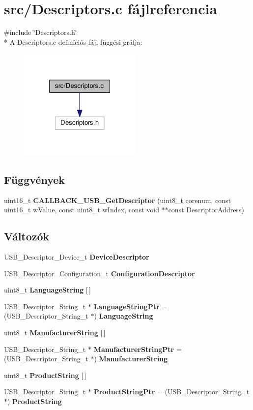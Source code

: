 \section{src/\-Descriptors.c fájlreferencia}
\label{_descriptors_8c}
{\ttfamily \#include \char`\"{}Descriptors.\-h\char`\"{}}\\*
A Descriptors.\-c definíciós fájl függési gráfja\-:
\nopagebreak
\begin{figure}[H]
\begin{center}
\leavevmode
\includegraphics[width=172pt]{_descriptors_8c__incl}
\end{center}
\end{figure}
\subsection*{Függvények}
\begin{DoxyCompactItemize}
\item 
uint16\-\_\-t {\bf C\-A\-L\-L\-B\-A\-C\-K\-\_\-\-U\-S\-B\-\_\-\-Get\-Descriptor} (uint8\-\_\-t corenum, const uint16\-\_\-t w\-Value, const uint8\-\_\-t w\-Index, const void $\ast$$\ast$const Descriptor\-Address)
\end{DoxyCompactItemize}
\subsection*{Változók}
\begin{DoxyCompactItemize}
\item 
U\-S\-B\-\_\-\-Descriptor\-\_\-\-Device\-\_\-t {\bf Device\-Descriptor}
\item 
U\-S\-B\-\_\-\-Descriptor\-\_\-\-Configuration\-\_\-t {\bf Configuration\-Descriptor}
\item 
uint8\-\_\-t {\bf Language\-String} [$\,$]
\item 
U\-S\-B\-\_\-\-Descriptor\-\_\-\-String\-\_\-t $\ast$ {\bf Language\-String\-Ptr} = (U\-S\-B\-\_\-\-Descriptor\-\_\-\-String\-\_\-t $\ast$) {\bf Language\-String}
\item 
uint8\-\_\-t {\bf Manufacturer\-String} [$\,$]
\item 
U\-S\-B\-\_\-\-Descriptor\-\_\-\-String\-\_\-t $\ast$ {\bf Manufacturer\-String\-Ptr} = (U\-S\-B\-\_\-\-Descriptor\-\_\-\-String\-\_\-t $\ast$) {\bf Manufacturer\-String}
\item 
uint8\-\_\-t {\bf Product\-String} [$\,$]
\item 
U\-S\-B\-\_\-\-Descriptor\-\_\-\-String\-\_\-t $\ast$ {\bf Product\-String\-Ptr} = (U\-S\-B\-\_\-\-Descriptor\-\_\-\-String\-\_\-t $\ast$) {\bf Product\-String}
\end{DoxyCompactItemize}


